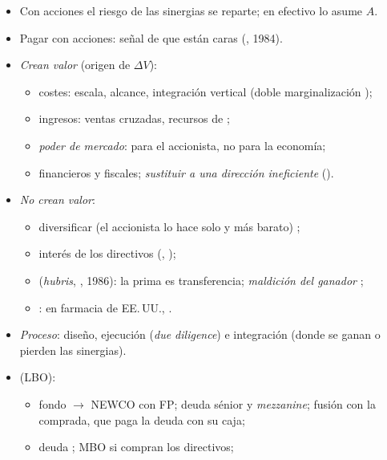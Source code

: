 \documentclass{article}
\begin{document}
\begin{columnas}
\begin{itemize}
\begin{itemize}
  \item Con acciones el riesgo de las sinergias se reparte; en efectivo lo asume $A$.
  \item Pagar con acciones: señal de que están caras (, 1984).
  \end{itemize}
\end{itemize}
\begin{itemize}
\item \emph{Crean valor} (origen de $\Delta V$):
  \begin{itemize}
  \item costes: escala, alcance, integración vertical (doble marginalización );
  \item ingresos: ventas cruzadas, recursos de ;
  \item \emph{poder de mercado}: para el accionista, no para la economía;
  \item financieros y fiscales; \emph{sustituir a una dirección ineficiente} ().
  \end{itemize}
\item \emph{No crean valor}:
  \begin{itemize}
  \item diversificar (el accionista lo hace solo y más barato) ;
  \item interés de los directivos (, );
  \item {} (\emph{hubris}, , 1986): la prima es transferencia; \emph{maldición del ganador} ;
  \item {}: en farmacia de EE.\,UU., .
  \end{itemize}
\end{itemize}
\begin{itemize}
\item \emph{Proceso}: diseño, ejecución (\emph{due diligence}) e integración (donde se ganan o pierden las sinergias).
\item {} (LBO):
  \begin{itemize}
  \item fondo $\to$ NEWCO con FP; deuda sénior y \emph{mezzanine}; fusión con la comprada, que paga la deuda con su caja;
  \item deuda ; MBO si compran los directivos;

\end{itemize}
\end{itemize}
\end{columnas}
\end{document}
